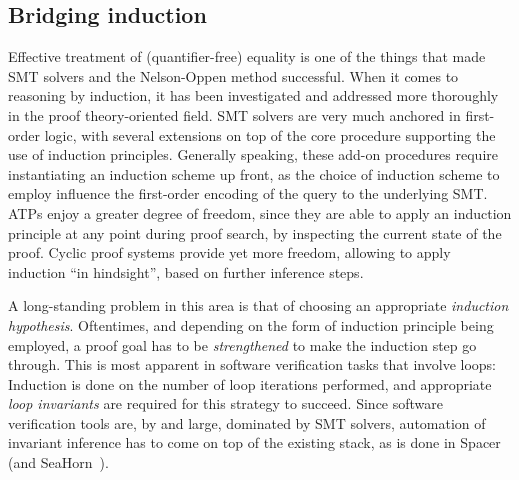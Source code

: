 \subsection{Bridging induction}
\label{plan-induction}

Effective treatment of (quantifier-free) equality is one of the things that made SMT solvers and the Nelson-Oppen method successful.
When it comes to reasoning by induction, it has been investigated and addressed more thoroughly in the proof theory-oriented field.
SMT solvers are very much anchored in first-order logic, with several extensions on top of the core procedure supporting the use of induction principles.
Generally speaking, these add-on procedures require instantiating an induction scheme up front, as the choice of induction scheme to employ influence the first-order encoding of the query to the underlying SMT.
ATPs enjoy a greater degree of freedom, since they are able to apply an induction principle at any point during proof search, by inspecting the current state of the proof.
Cyclic proof systems provide yet more freedom, allowing to apply induction ``in hindsight'', based on further inference steps.

A long-standing problem in this area is that of choosing an appropriate \emph{induction hypothesis}.
Oftentimes, and depending on the form of induction principle being employed, a proof goal has to be \emph{strengthened} to make the induction step go through.
This is most apparent in software verification tasks that involve loops:
Induction is done on the number of loop iterations performed, and appropriate \emph{loop invariants} are required for this strategy to succeed.
Since software verification tools are, by and large, dominated by SMT solvers, automation of invariant inference has to come on top of the existing stack, as is done in Spacer~\cite{spacer} (and SeaHorn~\cite{seahorn}).

